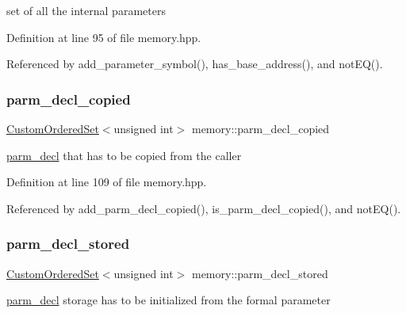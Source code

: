 set of all the internal parameters 



Definition at line 95 of file memory.\+hpp.



Referenced by add\+\_\+parameter\+\_\+symbol(), has\+\_\+base\+\_\+address(), and not\+E\+Q().

\mbox{\label{classmemory_a7f54cdccc221acb58e2c87898f4e7005}} 
\subsubsection{\texorpdfstring{parm\+\_\+decl\+\_\+copied}{parm\_decl\_copied}}
{\footnotesize\ttfamily \hyperlink{classCustomOrderedSet}{Custom\+Ordered\+Set}$<$unsigned int$>$ memory\+::parm\+\_\+decl\+\_\+copied\hspace{0.3cm}{\ttfamily [private]}}



\hyperlink{structparm__decl}{parm\+\_\+decl} that has to be copied from the caller 



Definition at line 109 of file memory.\+hpp.



Referenced by add\+\_\+parm\+\_\+decl\+\_\+copied(), is\+\_\+parm\+\_\+decl\+\_\+copied(), and not\+E\+Q().

\mbox{\label{classmemory_a9dc8f2a404f5d05c44e43d5b0d05d3e8}} 
\subsubsection{\texorpdfstring{parm\+\_\+decl\+\_\+stored}{parm\_decl\_stored}}
{\footnotesize\ttfamily \hyperlink{classCustomOrderedSet}{Custom\+Ordered\+Set}$<$unsigned int$>$ memory\+::parm\+\_\+decl\+\_\+stored\hspace{0.3cm}{\ttfamily [private]}}



\hyperlink{structparm__decl}{parm\+\_\+decl} storage has to be initialized from the formal parameter 




